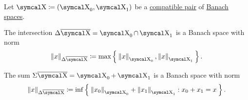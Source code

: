 \begin{proposition}\label{def:banach_space_sum_and_intersection_norms}
  Let \( \CX \coloneqq (\CX_0, \CX_1) \) be a \hyperref[def:interpolated_topological_vector_space/compatibility]{compatible pair} of \hyperref[def:banach_space]{Banach spaces}.

  \begin{PropEnum}
     The intersection \( \Delta \Ol{\CX} = \CX_0 \cap \CX_1 \) is a Banach space with norm
    \begin{equation}\label{eq:def:banach_space_sum_and_intersection_norms/intersection}
      \Norm{x}_{\Delta \Ol{\CX}} \coloneqq \max \Set{ \Norm{x}_{\CX_0}, \Norm{x}_{\CX_1} }.
    \end{equation}

     The sum \( \Sigma \Ol{\CX} = \CX_0 + \CX_1 \) is a Banach space with norm
    \begin{equation}\label{eq:def:banach_space_sum_and_intersection_norms/intersection}
      \Norm{x}_{\Delta \Ol{\CX}} \coloneqq \inf \Set{ \Norm{x_0}_{\CX_0} + \Norm{x_1}_{\CX_1} : x_0 + x_1 = x }.
    \end{equation}
  \end{PropEnum}
\end{proposition}
